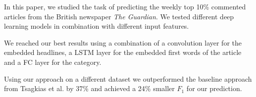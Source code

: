 In this paper, we studied the task of predicting the weekly top 10\% commented articles from the British newspaper \textit{The Guardian}. We tested different deep learning models in combination with different input features.

We reached our best results using a combination of a convolution layer for the embedded headlines, a LSTM layer for the embedded first words of the article and a FC layer for the category.

Using our approach on a different dataset we outperformed the baseline approach from Tsagkias et al. \cite{tsagkias2009predicting} by 37\% and achieved a 24\% smaller $F_1$ for our prediction.